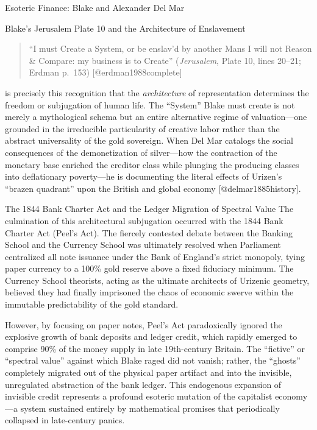 \documentclass[
  ignorenonframetext,
]{beamer}
\begin{document}
\begin{frame}{Esoteric Finance: Blake and Alexander Del Mar}
\begin{block}{Blake's Jerusalem Plate 10 and the Architecture of
Enslavement}
\begin{quote}
``I must Create a System, or be enslav'd by another Mans I will not
Reason \& Compare: my business is to Create'' (\emph{Jerusalem}, Plate
10, lines 20--21; Erdman p.~153) {[}@erdman1988complete{]}
\end{quote}

is precisely this recognition that the \emph{architecture} of
representation determines the freedom or subjugation of human life. The
``System'' Blake must create is not merely a mythological schema but an
entire alternative regime of valuation---one grounded in the irreducible
particularity of creative labor rather than the abstract universality of
the gold sovereign. When Del Mar catalogs the social consequences of the
demonetization of silver---how the contraction of the monetary base
enriched the creditor class while plunging the producing classes into
deflationary poverty---he is documenting the literal effects of Urizen's
``brazen quadrant'' upon the British and global economy
{[}@delmar1885history{]}.
\end{block}

\begin{block}{The 1844 Bank Charter Act and the Ledger Migration of
Spectral Value}
\protect{}\label{the-1844-bank-charter-act-and-the-ledger-migration-of-spectral-value}
The culmination of this architectural subjugation occurred with the 1844
Bank Charter Act (Peel's Act). The fiercely contested debate between the
Banking School and the Currency School was ultimately resolved when
Parliament centralized all note issuance under the Bank of England's
strict monopoly, tying paper currency to a 100\% gold reserve above a
fixed fiduciary minimum. The Currency School theorists, acting as the
ultimate architects of Urizenic geometry, believed they had finally
imprisoned the chaos of economic swerve within the immutable
predictability of the gold standard.

However, by focusing on paper notes, Peel's Act paradoxically ignored
the explosive growth of bank deposits and ledger credit, which rapidly
emerged to comprise 90\% of the money supply in late 19th-century
Britain. The ``fictive'' or ``spectral value'' against which Blake raged
did not vanish; rather, the ``ghosts'' completely migrated out of the
physical paper artifact and into the invisible, unregulated abstraction
of the bank ledger. This endogenous expansion of invisible credit
represents a profound esoteric mutation of the capitalist economy---a
system sustained entirely by mathematical promises that periodically
collapsed in late-century panics.
\end{block}


\end{frame}
\end{document}

